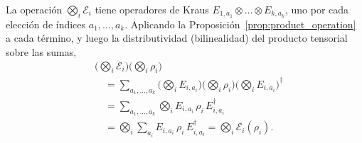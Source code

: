 \documentclass{ieeeaccess}
\begin{document}
\begin{IEEEproof}
  La operación $\bigotimes_i \mathcal{E}_i$ tiene operadores de Kraus $E_{1,a_1} \otimes \dots \otimes E_{k,a_k}$, uno por cada elección de índices $a_1, \dots, a_k$. Aplicando la Proposición~\ref{prop:product_operation} a cada término, y luego la distributividad (bilinealidad) del producto tensorial sobre las sumas,
  \begin{align*}
    &\Big(\bigotimes_{i} \mathcal{E}_i\Big)\Big(\bigotimes_{i} \rho_i\Big) \\
    &\quad= \sum_{a_1, \dots, a_k} \Big(\bigotimes_{i} E_{i,a_i}\Big)\Big(\bigotimes_{i} \rho_i\Big)\Big(\bigotimes_{i} E_{i,a_i}\Big)^{\dagger} \\
    &\quad= \sum_{a_1, \dots, a_k} \bigotimes_{i} E_{i,a_i}\, \rho_i\, E_{i,a_i}^{\dagger} \\
    &\quad= \bigotimes_{i} \sum_{a_i} E_{i,a_i}\, \rho_i\, E_{i,a_i}^{\dagger}
       = \bigotimes_{i} \mathcal{E}_i(\rho_i).
  \end{align*}
\end{IEEEproof}

\clearpage
\raggedbottom





\EOD
\end{document}
